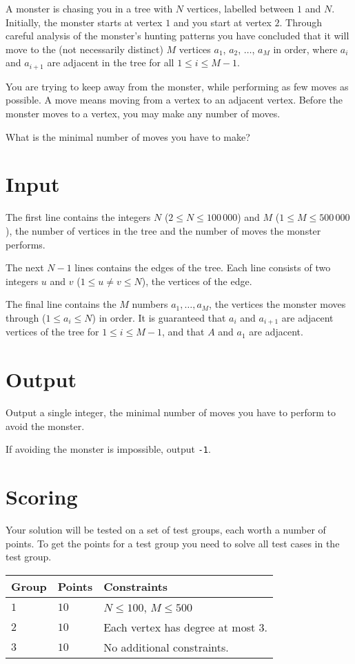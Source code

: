 A monster is chasing you in a tree with $N$ vertices, labelled between $1$ and $N$.
Initially, the monster starts at vertex $1$ and you start at vertex $2$.
Through careful analysis of the monster's hunting patterns you have concluded that it will move to the (not necessarily distinct) $M$ vertices $a_1$, $a_2$, $\dots$, $a_M$ in order, where $a_i$ and $a_{i+1}$ are adjacent in the tree for all $1 \le i \le M - 1$.

You are trying to keep away from the monster, while performing as few moves as possible.
A move means moving from a vertex to an adjacent vertex.
Before the monster moves to a vertex, you may make any number of moves.

What is the minimal number of moves you have to make?

\section*{Input}
The first line contains the integers $N$ ($2 \le N \le 100\,000$) and $M$ ($1 \le M \le 500\,000$), the number of vertices in the tree and the number of moves the monster performs.

The next $N-1$ lines contains the edges of the tree.
Each line consists of two integers $u$ and $v$ ($1 \le u \neq v \le N$), the vertices of the edge.

The final line contains the $M$ numbers $a_1, \dots, a_M$, the vertices the monster moves through ($1 \le a_i \le N$) in order.
It is guaranteed that $a_i$ and $a_{i+1}$ are adjacent vertices of the tree for $1 \le i \le M-1$, and that $A$ and $a_1$ are adjacent.

\section*{Output}
Output a single integer, the minimal number of moves you have to perform to avoid the monster.

If avoiding the monster is impossible, output \texttt{-1}.

\section*{Scoring}
Your solution will be tested on a set of test groups, each worth a number of points.
To get the points for a test group you need to solve all test cases in the test group.

\noindent
\begin{tabular}{| l | l | p{10cm} |}
  \hline
  Group & Points & Constraints \\ \hline
  $1$   & $10$   & $N \le 100$, $M \le 500$ \\ \hline
  $2$   & $10$   & Each vertex has degree at most $3$. \\ \hline
  $3$   & $10$   & No additional constraints. \\ \hline
\end{tabular}
